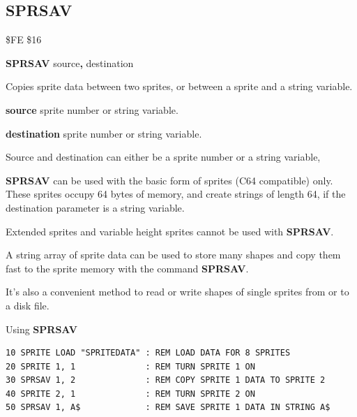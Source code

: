 \subsection{SPRSAV}
\begin{description}[leftmargin=2cm,style=nextline]
\item [Token:]    \$FE \$16

\item [Format:]   {\bf SPRSAV} source{\bf,} destination

\item [Usage:]    Copies sprite data between two sprites, or between a sprite and a string variable.

                  {\bf source} sprite number or string variable.

                  {\bf destination} sprite number or string variable.

\item [Remarks:]  Source and destination can either be a sprite number or a string variable,

                  {\bf SPRSAV} can be used with the basic form of sprites (C64 compatible) only. These sprites occupy 64 bytes of memory, and create strings of length 64, if the destination parameter is a string variable.

                  Extended sprites and variable height sprites cannot be used with {\bf SPRSAV}.

                  A string array of sprite data can be used to store many shapes and copy them fast to the sprite memory with the command {\bf SPRSAV}.

                  It's also a convenient method to read or write shapes of single sprites from or to a disk file.

\item [Example:]  Using {\bf SPRSAV}

\begin{tcolorbox}[colback=black,coltext=white]
\verbatimfont{\codefont}
\begin{verbatim}
10 SPRITE LOAD "SPRITEDATA" : REM LOAD DATA FOR 8 SPRITES
20 SPRITE 1, 1              : REM TURN SPRITE 1 ON
30 SPRSAV 1, 2              : REM COPY SPRITE 1 DATA TO SPRITE 2
40 SPRITE 2, 1              : REM TURN SPRITE 2 ON
50 SPRSAV 1, A$             : REM SAVE SPRITE 1 DATA IN STRING A$
\end{verbatim}
\end{tcolorbox}
\end{description}

